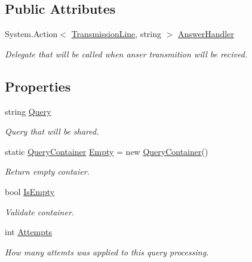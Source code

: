 \subsection*{Public Attributes}
\begin{DoxyCompactItemize}
\item 
System.\+Action$<$ \mbox{\hyperlink{class_pipes_provider_1_1_transmission_line}{Transmission\+Line}}, string $>$ \mbox{\hyperlink{struct_pipes_provider_1_1_query_container_aa04364ca7f1fc51a91671d1d74b8d810}{Answer\+Handler}}
\begin{DoxyCompactList}\small\item\em Delegate that will be called when anser transmition will be recived. \end{DoxyCompactList}\end{DoxyCompactItemize}
\subsection*{Properties}
\begin{DoxyCompactItemize}
\item 
string \mbox{\hyperlink{struct_pipes_provider_1_1_query_container_a6d66f084a62271934e708750d4c4dafa}{Query}}
\begin{DoxyCompactList}\small\item\em Query that will be shared. \end{DoxyCompactList}\item 
static \mbox{\hyperlink{struct_pipes_provider_1_1_query_container}{Query\+Container}} \mbox{\hyperlink{struct_pipes_provider_1_1_query_container_a3daff9827ee4f77286eb4385a64e2fe2}{Empty}} = new \mbox{\hyperlink{struct_pipes_provider_1_1_query_container}{Query\+Container}}()
\begin{DoxyCompactList}\small\item\em Return empty contaier. \end{DoxyCompactList}\item 
bool \mbox{\hyperlink{struct_pipes_provider_1_1_query_container_a3449e3e35c97dd80bd2f8076160633fa}{Is\+Empty}}
\begin{DoxyCompactList}\small\item\em Validate container. \end{DoxyCompactList}\item 
int \mbox{\hyperlink{struct_pipes_provider_1_1_query_container_aaeb530fcd4fde620a6f32343dcecfc4b}{Attempts}}
\begin{DoxyCompactList}\small\item\em How many attemts was applied to this query processing. \end{DoxyCompactList}\end{DoxyCompactItemize}


